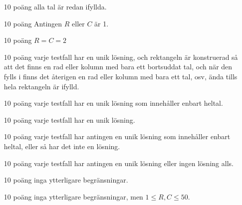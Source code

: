 \begin{enumerate}
	\item[10 poäng] alla tal är redan ifyllda.
	\item[10 poäng] Antingen $R$ eller $C$ är 1.
	\item[10 poäng] $R = C = 2$
	\item[10 poäng] varje testfall har en unik lösning, och rektangeln är konstruerad så att det finns en rad eller kolumn med bara ett bortsuddat tal, och när den fylls i finns det återigen en rad eller kolumn med bara ett tal, osv, ända tills hela rektangeln är ifylld. 
	\item[10 poäng] varje testfall har en unik lösning som innehåller enbart heltal.
	\item[10 poäng] varje testfall har en unik lösning.
	\item[10 poäng] varje testfall har antingen en unik lösning som innehåller enbart heltal, eller så har det inte en lösning.
	\item[10 poäng] varje testfall har antingen en unik lösning eller ingen lösning alls.
	\item[10 poäng] inga ytterligare begränsningar.
	\item[10 poäng] inga ytterligare begränsningar, men $1 \le R, C \le 50$.
\end{enumerate}
